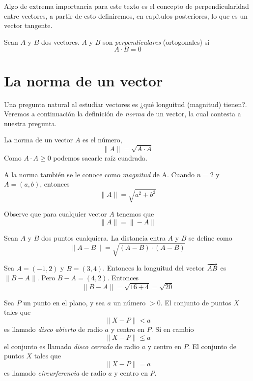Algo de extrema importancia para este texto es el concepto de perpendicularidad entre vectores, a partir
de esto definiremos, en capítulos posteriores, lo que es un vector tangente.

\begin{definition}
    Sean $A$ y $B$ dos vectores. $A$ y $B$ son \emph{perpendiculares} (ortogonales) si
    $$ A \cdot B = 0 $$
\end{definition}

\section{La norma de un vector}

Una pregunta natural al estudiar vectores es ¿qué longuitud (magnitud) tienen?. Veremos a continuación
la definición de \emph{norma} de un vector, la cual contesta a nuestra pregunta.

\begin{definition}
    La norma de un vector $A$ es el número,
    $$ \| A \| = \sqrt{A \cdot A} $$
    Como $A \cdot A \ge 0$ podemos sacarle raíz cuadrada. 
\end{definition}

A la norma también se le conoce como \emph{magnitud} de A. Cuando $n=2$ y $A = (a,b)$, entonces
    $$ \| A \| = \sqrt{a^{2} + b^{2}} $$

Observe que para cualquier vector $A$ tenemos que 
$$ \| A \| = \| -A \| $$

\begin{definition}
    Sean $A$ y $B$ dos puntos cualquiera. La distancia entra $A$ y $B$ se define como
    $$ \| A - B \| = \sqrt{(A-B) \cdot (A-B)} $$
\end{definition}

\begin{myExample}\label{ex:distance}
    Sea $A = (-1,2)$ y $B = (3,4)$. Entonces la longuitud del vector $\overrightarrow{AB}$ es $\|B-A\|$. Pero
    $B-A = (4,2)$. Entonces
    $$\|B-A\| = \sqrt{16+4} = \sqrt{20} $$
\end{myExample}

Sea $P$ un punto en el plano, y sea $a$ un número $> 0$. El conjunto de puntos $X$ tales que
$$ \| X - P \| < a $$
es llamado \emph{disco abierto} de radio $a$ y centro en $P$. Si en cambio
$$ \| X - P \| \le a $$
el conjunto es llamado \emph{disco cerrado} de radio $a$ y centro en $P$. El conjunto de puntos
$X$ tales que
$$ \| X - P \| = a $$
es llamado \emph{circurferencia} de radio $a$ y centro en $P$.

